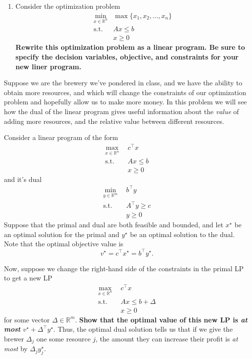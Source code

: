 \documentclass[11pt]{article}
\newcommand{\R}{\mathbb{R}}
\theoremstyle{definition}
\begin{document}
\begin{enumerate}[leftmargin=0pt]
\begin{enumerate}[leftmargin=0pt, itemsep=1ex]
    \item Consider the optimization problem
    \begin{align*}
    \min_{x \in \R^n}   &\max\{x_1,x_2,\dots,x_n\} \\
    \text{s.t. }        &Ax \leq b\\
                        &x \geq 0
    \end{align*}
    {\bfseries Rewrite this optimization problem as a linear program.  Be sure to specify the decision variables, objective, and constraints for your new liner program.}
\end{enumerate}

\problemitem
Suppose we are the brewery we've pondered in class, and we have the ability to obtain more resources, and which will change the constraints of our optimization problem and hopefully allow us to make more money.  In this problem we will see how the dual of the linear program gives useful information about the \emph{value} of adding more resources, and the relative value between different resources.

Consider a linear program of the form
\begin{align*}
    \max_{x \in \R^n}~~   &c^\top x \\
    \text{s.t. }        &Ax \leq b\\
                        &x \geq 0
\end{align*}
and it's dual
\begin{align*}
    \min_{y \in \R^m}~~   &b^\top y \\
    \text{s.t. }        &A^\top y \geq c\\
                        &y \geq 0
\end{align*}
Suppose that the primal and dual are both feasible and bounded, and let $x^\star$ be an optimal solution for the primal and $y^\star$ be an optimal solution to the dual.  Note that the optimal objective value is $$v^\star = c^\top x^\star = b^\top y^\star.$$

Now, suppose we change the right-hand side of the constraints in the primal LP to get a new LP
\begin{align*}
    \max_{x \in \R^n}~~   &c^\top x \\
    \text{s.t. }        &Ax \leq b + \Delta\\
                        &x \geq 0
\end{align*}
for some vector $\Delta \in \R^m$.  {\bf Show that the optimal value of this new LP is \emph{at most} $v^\star + \Delta^\top y^\star.$}  Thus, the optimal dual solution tells us that if we give the brewer $\Delta_j$ one some resource $j$, the amount they can increase their profit is \emph{at most} by $\Delta_j y^\star_j$.


\end{enumerate}
\end{document}
